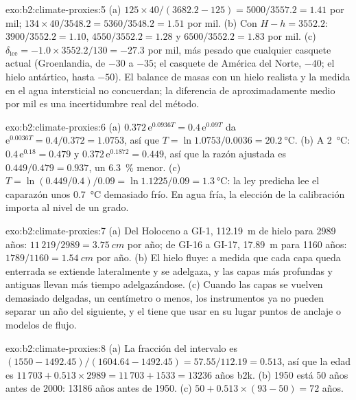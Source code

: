 \begin{solution}{exo:b2:climate-proxies:5}
(a) $125 \times 40/(3682.2 - 125) = 5000/3557.2 = 1.41$ por mil; $134 \times 40/3548.2 =
5360/3548.2 = 1.51$ por mil. (b) Con $H - h = 3552.2$: $3900/3552.2 = 1.10$, $4550/3552.2 = 1.28$
y $6500/3552.2 = 1.83$ por mil. (c) $\delta_{\mathrm{ice}} = -1.0 \times 3552.2/130 = -27.3$ por
mil, más pesado que cualquier casquete actual (Groenlandia, de $-30$ a $-35$; el casquete de América del Norte,
$-40$; el hielo antártico, hasta $-50$). El balance de masas con un hielo realista y la medida en el agua
intersticial no concuerdan; la diferencia de aproximadamente medio por mil es una incertidumbre real del método.
\end{solution}

\begin{solution}{exo:b2:climate-proxies:6}
(a) $0.372\,\mathrm{e}^{0.0936T} = 0.4\,\mathrm{e}^{0.09T}$ da $\mathrm{e}^{0.0036T} =
0.4/0.372 = 1.0753$, así que $T = \ln 1.0753/0.0036 = \qty{20.2}{\celsius}$. (b) A
\qty{2}{\celsius}: $0.4\,\mathrm{e}^{0.18} = 0.479$ y $0.372\,\mathrm{e}^{0.1872} = 0.449$, así que la
razón ajustada es $0.449/0.479 = 0.937$, un \qty{6.3}{\percent} menor. (c) $T = \ln(0.449/0.4)/0.09 =
\ln 1.1225/0.09 = \qty{1.3}{\celsius}$: la ley predicha lee el caparazón unos
\qty{0.7}{\celsius} demasiado frío. En agua fría, la elección de la calibración importa al nivel de un
grado.
\end{solution}

\begin{solution}{exo:b2:climate-proxies:7}
(a) Del Holoceno a GI-1, \qty{112.19}{m} de hielo para 2989 años: $11\,219/2989 =
\qty{3.75}{cm}$ por año; de GI-16 a GI-17, \qty{17.89}{m} para 1160 años: $1789/1160 =
\qty{1.54}{cm}$ por año. (b) El hielo
fluye: a medida que cada capa queda enterrada se extiende lateralmente y se adelgaza, y las capas más profundas y antiguas
llevan más tiempo adelgazándose. (c) Cuando las capas se vuelven demasiado delgadas, un centímetro o menos, los instrumentos
ya no pueden separar un año del siguiente, y el  tiene que usar en su lugar puntos de anclaje o modelos de
flujo.
\end{solution}

\begin{solution}{exo:b2:climate-proxies:8}
(a) La fracción del intervalo es $(1550 - 1492.45)/(1604.64 - 1492.45) = 57.55/112.19 = 0.513$,
así que la edad es $11\,703 + 0.513 \times 2989 = 11\,703 + 1533 = \num{13236}$ años b2k. (b) 1950 está 50
años antes de 2000: \num{13186} años antes de 1950. (c) $50 + 0.513 \times (93 - 50) = 72$ años.
\end{solution}


